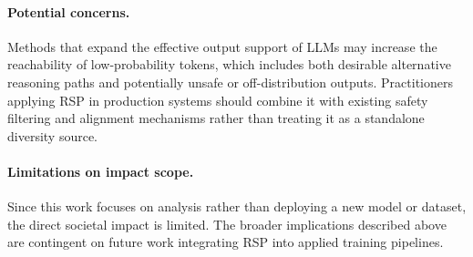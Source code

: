 \paragraph{Potential concerns.}
Methods that expand the effective output support of LLMs may increase the reachability of low-probability tokens, which includes both desirable alternative reasoning paths and potentially unsafe or off-distribution outputs. Practitioners applying RSP in production systems should combine it with existing safety filtering and alignment mechanisms rather than treating it as a standalone diversity source.

\paragraph{Limitations on impact scope.}
Since this work focuses on analysis rather than deploying a new model or dataset, the direct societal impact is limited. The broader implications described above are contingent on future work integrating RSP into applied training pipelines.
